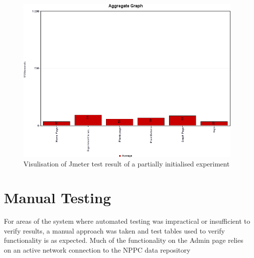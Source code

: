 \begin{figure}[H]
    \centering
    \includegraphics[width=\textwidth]{images/testing/jmeter_no_data}
    \caption{Visulisation of Jmeter test result of a partially initialised experiment}
    \label{fig:jmeter_no_data}
\end{figure} 




\section{Manual Testing}
For areas of the system where automated testing was impractical or insufficient to verify results, a manual approach was taken and test tables used to verify functionality is as expected. Much of the functionality on the Admin page relies on an active network connection to the NPPC data repository 


